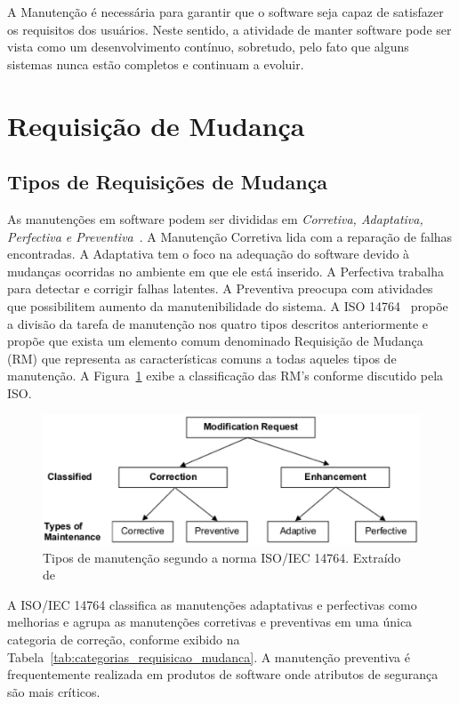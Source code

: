 A Manutenção é necessária para garantir que o software seja capaz de satisfazer
os requisitos dos usuários. Neste sentido, a atividade de manter software pode
ser vista como um desenvolvimento contínuo, sobretudo, pelo fato que alguns
sistemas nunca estão completos e continuam a evoluir.

\section{Requisição de Mudança}
\label{sec:requisição_de_mudanca}

\subsection{Tipos de Requisições de Mudança}
\label{subsec:tipos_de_requisicoes_mudanca}

As manutenções em software podem ser divididas em \textit{Corretiva, Adaptativa,
	Perfectiva e Preventiva}~\cite{Lientz:1980:SMM:601062,159342}.  A Manutenção
Corretiva lida com a reparação de falhas encontradas. A Adaptativa tem o foco na
adequação do software devido à mudanças ocorridas no ambiente em que ele está
inserido. A Perfectiva trabalha para detectar e corrigir falhas latentes. A
Preventiva preocupa com atividades que possibilitem aumento da manutenibilidade
do sistema.  A ISO 14764~\cite{1703974} propõe a divisão da tarefa de
manutenção nos quatro tipos descritos anteriormente e propõe que exista um
elemento comum denominado Requisição de Mudança (RM) que representa as
características comuns a todas aqueles tipos de manutenção. A
Figura~\ref{fig:modification-request} exibe a classificação das RM's conforme
discutido pela ISO\@.

\begin{figure}[hbtp] \centering \includegraphics[width=.75\textwidth]
	{chapter-intro/img/modification_request.eps} \caption{Tipos de manutenção
		segundo a norma ISO/IEC 14764. Extraído de~\cite{1703974}}
\label{fig:modification-request} \end{figure}

A ISO/IEC 14764 classifica as manutenções adaptativas e perfectivas como
me\-lho\-ri\-as e agrupa as manutenções corretivas e preventivas em uma única
categoria de correção, conforme exibido na
Tabela~\ref{tab:categorias_requisicao_mudanca}. A manutenção preventiva é
frequentemente realizada em produtos de software onde atributos de segurança são
mais críticos.

